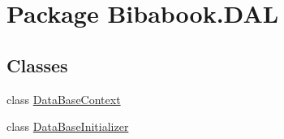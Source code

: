 \hypertarget{namespace_bibabook_1_1_d_a_l}{}\section{Package Bibabook.\+D\+A\+L}
\label{namespace_bibabook_1_1_d_a_l}
\subsection*{Classes}
\begin{DoxyCompactItemize}
\item 
class \hyperlink{class_bibabook_1_1_d_a_l_1_1_data_base_context}{Data\+Base\+Context}
\item 
class \hyperlink{class_bibabook_1_1_d_a_l_1_1_data_base_initializer}{Data\+Base\+Initializer}
\end{DoxyCompactItemize}
